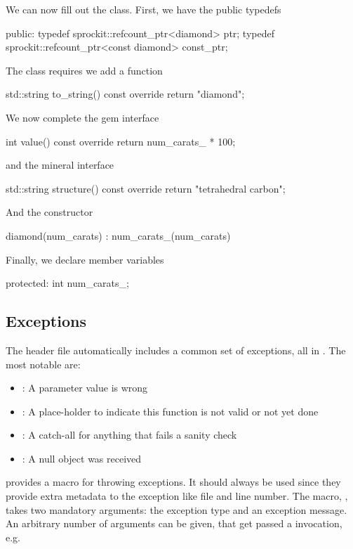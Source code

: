 We can now fill out the class.  First, we have the public typedefs

\begin{CppCode}
 public:
  typedef sprockit::refcount_ptr<diamond> ptr;
  typedef sprockit::refcount_ptr<const diamond> const_ptr;
\end{CppCode}


The  class requires we add a  function

\begin{CppCode}
std::string to_string() const override {
  return "diamond";
}
\end{CppCode}

We now complete the gem interface

\begin{CppCode}
int value() const override {
  return num_carats_ * 100;
}
\end{CppCode}

and the mineral interface
\begin{CppCode}
std::string structure() const override {
  return "tetrahedral carbon";
}
\end{CppCode}

And the constructor

\begin{CppCode}
  diamond(num_carats)
   : num_carats_(num_carats)
{
}
\end{CppCode}

Finally, we declare member variables

\begin{CppCode}
 protected:
  int num_carats_;
\end{CppCode}


\subsection{Exceptions}
\label{classes:style:basic:exceptions}

The  header file automatically includes a common set of exceptions, all in .
The most notable are:
\begin{itemize}
\item {}: A parameter value is wrong
\item {}: A place-holder to indicate this function is not valid or not yet done
\item {}: A catch-all for anything that fails a sanity check
\item {}: A null object was received
\end{itemize}
\sprockit provides a macro for throwing exceptions.
It should always be used since they provide extra metadata to the exception like file and line number.
The macro, , takes two mandatory arguments: the exception type and an exception message.
An arbitrary number of arguments can be given, that get passed a  invocation, e.g.

